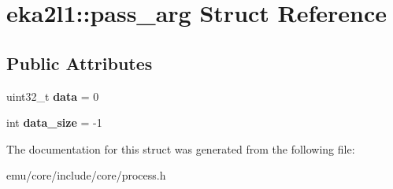 \hypertarget{structeka2l1_1_1pass__arg}{}\section{eka2l1\+:\+:pass\+\_\+arg Struct Reference}
\label{structeka2l1_1_1pass__arg}
\subsection*{Public Attributes}
\begin{DoxyCompactItemize}
\item 
\mbox{\label{structeka2l1_1_1pass__arg_ab2b3b7504ab999515bac3b97c591f5b5}} 
uint32\+\_\+t {\bfseries data} = 0
\item 
\mbox{\label{structeka2l1_1_1pass__arg_ac8e2252aa579bdc333ef1bb1fb0acc6e}} 
int {\bfseries data\+\_\+size} = -\/1
\end{DoxyCompactItemize}


The documentation for this struct was generated from the following file\+:\begin{DoxyCompactItemize}
\item 
emu/core/include/core/process.\+h\end{DoxyCompactItemize}
